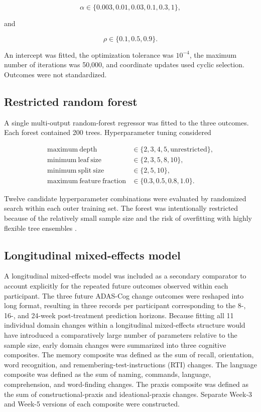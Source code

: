 \documentclass[11pt]{article}
\begin{document}
\begin{equation}
\alpha
\in
\{0.003,0.01,0.03,0.1,0.3,1\},
\end{equation}

and

\begin{equation}
\rho
\in
\{0.1,0.5,0.9\}.
\end{equation}

An intercept was fitted, the optimization tolerance was $10^{-4}$, the maximum number of
iterations was 50,000, and coordinate updates used cyclic selection. Outcomes were not
standardized.


\subsection{Restricted random forest}

A single multi-output random-forest regressor was fitted to the three outcomes.
Each forest contained 200 trees. Hyperparameter tuning considered

\begin{align}
\mathrm{maximum\ depth}
&\in
\{2,3,4,5,\mathrm{unrestricted}\},\\
\mathrm{minimum\ leaf\ size}
&\in
\{2,3,5,8,10\},\\
\mathrm{minimum\ split\ size}
&\in
\{2,5,10\},\\
\mathrm{maximum\ feature\ fraction}
&\in
\{0.3,0.5,0.8,1.0\}.
\end{align}

Twelve candidate hyperparameter combinations were evaluated by randomized search within each
outer training set. The forest was intentionally restricted because of the relatively small
sample size and the risk of overfitting with highly flexible tree ensembles
\citep{breiman2001random}.


\subsection{Longitudinal mixed-effects model}

A longitudinal mixed-effects model was included as a secondary comparator to account
explicitly for the repeated future outcomes observed within each participant. The three
future ADAS-Cog change outcomes were reshaped into long format, resulting in three
records per participant corresponding to the 8-, 16-, and 24-week post-treatment
prediction horizons. Because fitting all 11 individual domain changes within a longitudinal mixed-effects
structure would have introduced a comparatively large number of parameters relative to
the sample size, early domain changes were summarized into three cognitive composites.
The memory composite was defined as the sum of recall, orientation, word recognition,
and remembering-test-instructions (RTI) changes. The language composite was defined as
the sum of naming, commands, language, comprehension, and word-finding changes. The
praxis composite was defined as the sum of constructional-praxis and ideational-praxis
changes. Separate Week-3 and Week-5 versions of each composite were constructed.
\end{document}
